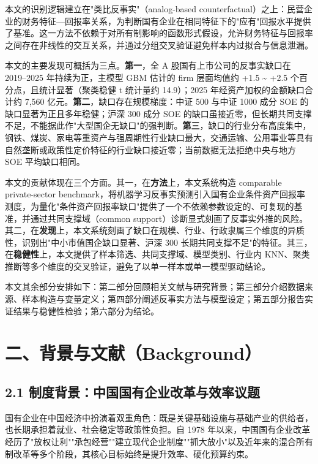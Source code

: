 \documentclass[11pt,a4paper]{ctexart}
\begin{document}
本文的识别逻辑建立在"类比反事实"（analog-based counterfactual）之上：民营企业的财务特征---回报率关系，为判断国有企业在相同特征下的"应有"回报水平提供了基准。这一方法不依赖于对所有制影响的函数形式假设，允许财务特征与回报率之间存在非线性的交互关系，并通过分组交叉验证避免样本内过拟合与信息泄漏。

本文的主要发现可概括为三点。\textbf{第一}，全 A 股国有上市公司的反事实缺口在 2019--2025 年持续为正，主模型 GBM 估计的 firm 层面均值约 +1.5 \textasciitilde{} +2.5 个百分点，且统计显著（聚类稳健 t 统计量约 14.9）；2025 年经资产加权的金额缺口合计约 7,560 亿元。\textbf{第二}，缺口存在规模梯度：中证 500 与中证 1000 成分 SOE 的缺口显著为正且多年稳健；沪深 300 成分 SOE 的缺口虽接近零，但长期共同支撑不足，不能据此作"大型国企无缺口"的强判断。\textbf{第三}，缺口的行业分布高度集中，钢铁、煤炭、家电等重资产与强周期性行业缺口最大，交通运输、公用事业等具有自然垄断或政策性定价特征的行业缺口接近零；当前数据无法拒绝中央与地方 SOE 平均缺口相同。

本文的贡献体现在三个方面。其一，在\textbf{方法}上，本文系统构造 comparable private-sector benchmark，将机器学习反事实预测引入国有企业条件资产回报率测度，为量化"条件资产回报率缺口"提供了一个不依赖参数设定的、可复现的基准，并通过共同支撑域（common support）诊断显式刻画了反事实外推的风险。其二，在\textbf{发现}上，本文系统刻画了缺口在规模、行业、行政隶属三个维度的异质性，识别出"中小市值国企缺口显著、沪深 300 长期共同支撑不足"的特征。其三，在\textbf{稳健性}上，本文提供了样本筛选、共同支撑域、模型类别、行业内 KNN、聚类推断等多个维度的交叉验证，避免了以单一样本或单一模型驱动结论。

本文其余部分安排如下：第二部分回顾相关文献与研究背景；第三部分介绍数据来源、样本构造与变量定义；第四部分阐述反事实方法与模型设定；第五部分报告实证结果与稳健性检验；第六部分为结论。

\section{二、背景与文献（Background）}

\subsection{2.1 制度背景：中国国有企业改革与效率议题}

国有企业在中国经济中扮演着双重角色：既是关键基础设施与基础产业的供给者，也长期承担着就业、社会稳定等政策性负担。自 1978 年以来，中国国有企业改革经历了"放权让利""承包经营""建立现代企业制度""抓大放小"以及近年来的混合所有制改革等多个阶段，其核心目标始终是提升效率、硬化预算约束。
\end{document}
